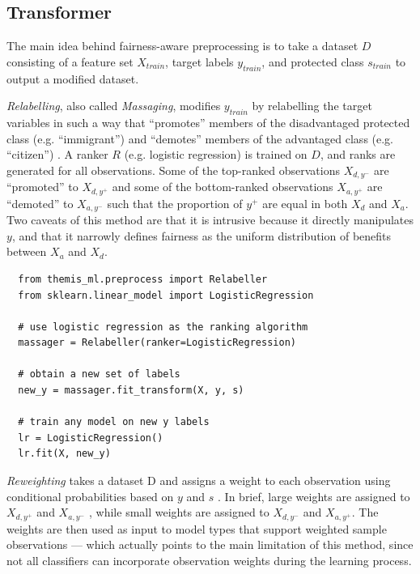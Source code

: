\documentclass{interact}
\begin{document}
\subsection{Transformer} The main idea behind fairness-aware preprocessing is to
take a dataset \(D\) consisting of a feature set \(X_{train}\), target labels
\(y_{train}\), and protected class \(s_{train}\) to output a modified dataset.

\emph{Relabelling}, also called \emph{Massaging}, modifies \(y_{train}\) by relabelling
the target variables in such a way that ``promotes'' members of the
disadvantaged protected class (e.g. ``immigrant'') and ``demotes'' members of
the advantaged class (e.g. ``citizen'') \cite{kamiran2012data}. A ranker \(R\)
(e.g. logistic regression) is trained on \(D\), and ranks are generated for
all observations. Some of the top-ranked observations \(X_{d, y^{-}}\)  are
``promoted'' to \(X_{d, y^{+}}\) and some of the bottom-ranked observations
\(X_{a, y^{+}}\)  are ``demoted'' to \(X_{a, y^{-}}\) such that the proportion
of \(y^{+}\) are equal in both \(X_d\) and \(X_a\). Two caveats of this method
are that it is intrusive because it directly manipulates \(y\), and that it
narrowly defines fairness as the uniform distribution of benefits between
\(X_a\) and \(X_d\).

\begin{verbatim}
  from themis_ml.preprocess import Relabeller
  from sklearn.linear_model import LogisticRegression

  # use logistic regression as the ranking algorithm
  massager = Relabeller(ranker=LogisticRegression)

  # obtain a new set of labels
  new_y = massager.fit_transform(X, y, s)

  # train any model on new y labels
  lr = LogisticRegression()
  lr.fit(X, new_y)
\end{verbatim}

\emph{Reweighting} takes a dataset D and assigns a weight to each observation
using conditional probabilities based on \(y\) and \(s\) \cite{kamiran2012data}.
In brief, large weights are assigned to \(X_{d, y^{+}}\) and \(X_{a, y^{-}}\) ,
while small weights are assigned to \(X_{d, y^{-}}\) and \(X_{a, y^{+}}\). The
weights are then used as input to model types that support weighted sample
observations --- which actually points to the main limitation of this method,
since not all classifiers can incorporate observation weights during the
learning process.
\end{document}
